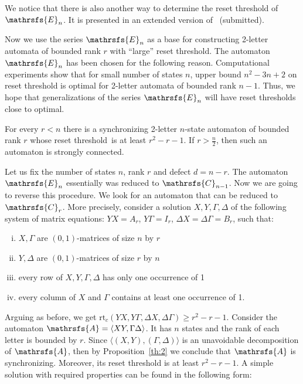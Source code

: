 \documentclass[11pt]{llncs}
\newcommand{\rl}{reset threshold}
\newcommand{\A}{\mathrsfs{A}}
\newcommand{\G}{\Gamma}
\newcommand{\D}{\Delta}
\newcommand{\rtc}{\mathrm{rt}_{c}}
\begin{document}
We notice that there is also another way to determine the reset threshold of $\mathrsfs{E}_n$. It is presented in an extended version
of~\cite{AGV} (submitted).

Now we use the series $\mathrsfs{E}_n$ as a base for constructing 2-letter automata of bounded rank $r$ with ``large'' reset threshold. The
automaton $\mathrsfs{E}_n$ has been chosen for the following reason. Computational experiments show that for small number of states $n$,
upper bound $n^2 -3n +2$ on reset threshold is optimal for 2-letter automata of bounded rank $n - 1$. Thus, we hope that generalizations of
the series $\mathrsfs{E}_n$ will have reset thresholds close to optimal.

\begin{proposition}
For every $r < n$ there is a synchronizing 2-letter $n$-state automaton of bounded rank $r$ whose \rl\ is at least $r^2 -r - 1$. If $r >
\frac{n}{2}$, then such an automaton is strongly connected.
\end{proposition}

Let us fix the number of states $n$, rank $r$ and defect $d = n - r$. The automaton $\mathrsfs{E}_n$ essentially was reduced to
$\mathrsfs{C}_{n - 1}$. Now we are going to reverse this procedure. We look for an automaton that can be reduced to $\mathrsfs{C}_r$. More
precisely, consider a solution $X,Y,\G,\D$ of the following system of matrix equations: $YX = A_{r}$, $Y\G = I_{r}$, $\D X = \D \G =
B_{r}$, such that:
\begin{enumerate}[(i)]
\item $X,\G$ are $(0,1)$-matrices of size $n$ by $r$
\item $Y,\D$ are $(0,1)$-matrices of size $r$ by $n$
\item every row of $X, Y, \G, \D$ has only one occurrence of 1
\item every column of $X$ and $\G$ contains at least one occurrence of 1.
\end{enumerate}
Arguing as before, we get $\rtc(YX, Y\G, \D X, \D \G) \geq r^2 - r - 1$. Consider the automaton $\A = \langle XY, \G\D \rangle$. It has $n$
states and the rank of each letter is bounded by $r$. Since $\langle (X,Y), (\G, \D) \rangle$ is an unavoidable decomposition of $\A$, then
by Proposition~\ref{th:2} we conclude that $\A$ is synchronizing. Moreover, its reset threshold is at least $r^2 - r - 1$. A simple
solution with required properties can be found in the following form:
\end{document}
